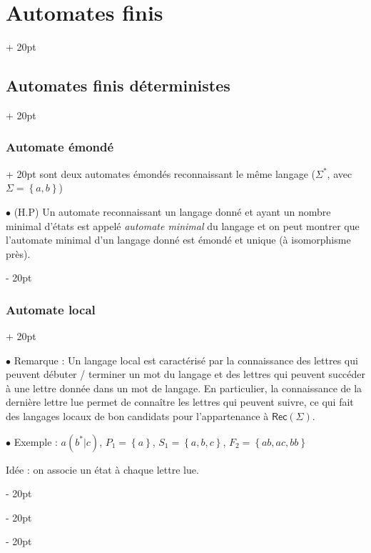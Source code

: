 \documentclass[a4paper, 12pt, twoside]{article}
\newcommand{\lr}[1]{\left( #1 \right)}
\newcommand{\set}[1]{\left\{ #1 \right\}}
\newcommand{\ind}[1][20pt]{\advance\leftskip + #1}
\newcommand{\deind}[1][20pt]{\advance\leftskip - #1}
\newenvironment{indt}[2][20pt]{#2 \par \ind[#1]}{\par \deind} %
\newcommand{\Rec}[1]{\mathsf{Rec}\!\lr{#1}}
\begin{document}
\begin{indt}{\section{Automates finis}}
\begin{indt}{\subsection{Automates finis déterministes}}
\begin{indt}{\subsubsection{Automate émondé}}
                sont deux automates émondés reconnaissant le même langage ($\Sigma^*$, avec $\Sigma = \set{a, b}$)

                \vspace{12pt}
                
                $\bullet$ (H.P) Un automate reconnaissant un langage donné et ayant un nombre minimal d'états est appelé \emph{automate minimal} du langage et on peut montrer que l'automate minimal d'un langage donné est émondé et unique (à isomorphisme près).
            \end{indt}

            \vspace{12pt}
            
            \begin{indt}{\subsubsection{Automate local}}
                \label{2.1.7}

                $\bullet$ Remarque :
                Un langage local est caractérisé par la connaissance des lettres qui peuvent débuter / terminer un mot du langage et des lettres qui peuvent succéder à une lettre donnée dans un mot de langage. En particulier, la connaissance de la dernière lettre lue permet de connaître les lettres qui peuvent suivre, ce qui fait des langages locaux de bon candidats pour l'appartenance à $\Rec \Sigma$.

                \vspace{12pt}
                
                $\bullet$ Exemple : $a(b^* | c)$, $P_1 = \set a$, $S_1 = \set{a, b, c}$, $F_2 = \set{ab, ac, bb}$

                Idée : on associe un état à chaque lettre lue.

                \begin{center}
\end{center}
\end{indt}
\end{indt}
\end{indt}
\end{document}
